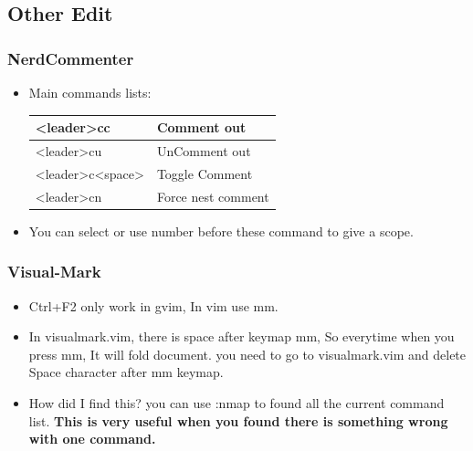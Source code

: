 \documentclass[a4paper,12pt,twoside]{book}
\begin{document}
\subsection{Other Edit}

\subsubsection{NerdCommenter}
\begin{itemize}
		\item Main commands lists:  

\begin{tabular}{p{}|p{}}
		\hline 
		[count]<leader>cc & Comment out \\
		\hline 
		[count]<leader>cu & UnComment out \\
		\hline 
		[count]<leader>c<space> & Toggle Comment \\
		\hline
		[count]<leader>cn & Force nest comment \\
\end{tabular}
\item You can select or use number before these command to give a scope. 
\end{itemize}

\subsubsection{Visual-Mark}
\begin{itemize}
		\item Ctrl+F2 only work in gvim, In vim use mm.
		\item In visualmark.vim, there is space after keymap mm, So everytime when you press mm, It will fold document. you need to go to visualmark.vim and delete Space character after mm keymap.
		\item How did I find this? you can use :nmap to found all the current command list. \textbf{This is very useful when you found there is something wrong with one command.}
\end{itemize}
\end{document}

